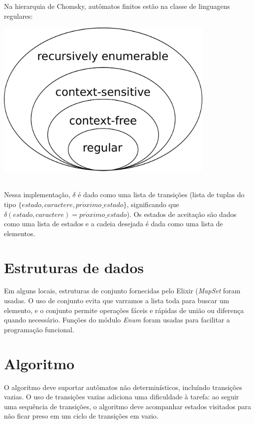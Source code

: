 \documentclass[conference]{IEEEtran}
\begin{document}
Na hierarquia de Chomsky, autômatos finitos estão na classe de linguagens regulares:

\begin{minipage}{\linewidth}
    \centering
    \label{chomsky}
    \includegraphics[width=0.8\textwidth]{Chomsky-hierarchy.pdf}
\end{minipage}
\\

Nessa implementação, $\delta$ é dado como uma lista de transições (lista de tuplas do tipo $\{estado, caractere, pr\acute{o}ximo\_estado\}$, significando que $\delta(estado, caractere) = pr\acute{o}ximo\_estado$). Os estados de aceitação são dados como uma lista de estados e a cadeia desejada é dada como uma lista de elementos.

\section{Estruturas de dados}

Em alguns locais, estruturas de conjunto fornecidas pelo Elixir (\emph{MapSet} foram usadas. O uso de conjunto evita que varramos a lista toda para buscar um elemento, e o conjunto permite operações fáceis e rápidas de união ou diferença quando necessário. Funções do módulo \emph{Enum} foram usadas para facilitar a programação funcional.

\section{Algoritmo}

O algoritmo deve suportar autômatos não determinísticos, incluíndo transições vazias. O uso de transições vazias adiciona uma dificuldade à tarefa: ao seguir uma sequência de transições, o algoritmo deve acompanhar estados visitados para não ficar preso em um ciclo de transições em vazio.
\end{document}

